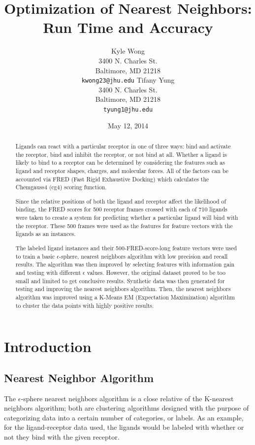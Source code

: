 \documentclass[11pt,letterpaper]{article}
\title{Optimization of Nearest Neighbors: Run Time and Accuracy}
\author{Kyle Wong \\
  3400 N. Charles St. \\
  Baltimore, MD 21218 \\
  {\tt kwong23@jhu.edu}
  \And
  Tifany Yung \\
  3400 N. Charles St. \\
  Baltimore, MD 21218 \\
  {\tt tyung1@jhu.edu}}
\date{May 12, 2014}
\begin{document}
\maketitle
\begin{abstract}
Ligands can react with a particular receptor in one of three ways: bind and activate the receptor, bind and inhibit the receptor, or not bind at all. Whether a ligand is likely to bind to a receptor can be determined by considering the features such as ligand and receptor shapes, charges, and molecular forces. All of the factors can be accounted via FRED (Fast Rigid Exhaustive Docking) which calculates the Chemgauss4 (cg4) scoring function.

Since the relative positions of both the ligand and receptor affect the likelihood of binding, the FRED scores for 500 receptor frames crossed with each of 710 ligands were taken to create a system for predicting whether a particular ligand will bind with the receptor. These 500 frames were used as the features for feature vectors with the ligands as an instances.

The labeled ligand instances and their 500-FRED-score-long feature vectors were used to train a basic $\epsilon$-sphere, nearest neighbors algorithm with low precision and recall results. The algorithm was then improved by selecting features with information gain and testing with different $\epsilon$ values.  However, the original dataset proved to be too small and limited to get conclusive results.  Synthetic data was then generated for testing and improving the nearest neighbors algorithm.  Then, the nearest neighbors algorithm was improved using a K-Means EM (Expectation Maximization) algorithm to cluster the data points with highly positive results.  
\end{abstract}

\section{Introduction}
\subsection{Nearest Neighbor Algorithm}

The $\epsilon$-sphere nearest neighbors algorithm is a close relative of the K-nearest neighbors algorithm; both are clustering algorithms designed with the purpose of categorizing data into a certain number of categories, or labels. As an example, for the ligand-receptor data used, the ligands would be labeled with whether or not they bind with the given receptor.
\end{document}
